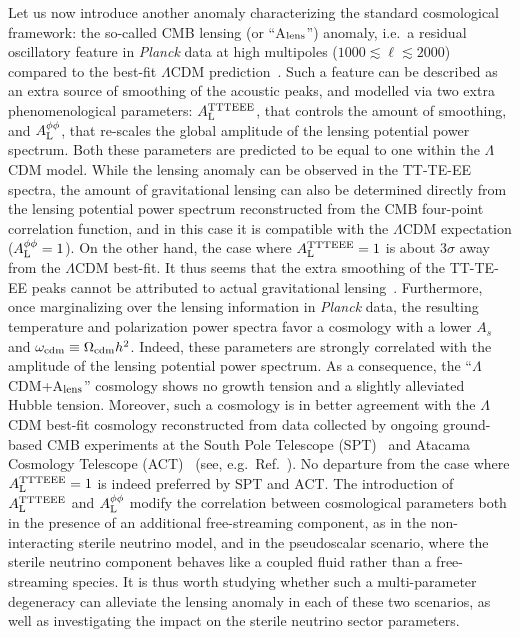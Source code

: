 \documentclass[a4paper,11pt]{article}
\begin{document}
Let us now introduce another anomaly characterizing the standard cosmological framework: the so-called CMB lensing (or ``A$_{\rm lens}$'') anomaly, i.e.\ a residual oscillatory feature in \emph{Planck} data at high multipoles ($1000 \lesssim \ell \lesssim 2000$) compared to the best-fit $\Lambda$CDM prediction~\cite{Calabrese:2008rt,Aghanim:2016sns,Planck:2018vyg,Efstathiou:2019mdh}.
Such a feature can be described as an extra source of smoothing of the acoustic peaks, and modelled via two extra {phenomenological} parameters: $A_{\rm L}^{\rm TTTEEE}$, that controls the amount of smoothing, and $A_{\rm L}^{\rm \phi\phi}$, that re-scales the global amplitude of the lensing potential power spectrum. Both these parameters are predicted to be equal to one within the $\Lambda$CDM model. While the lensing anomaly can be observed in the TT-TE-EE spectra, the amount of gravitational lensing can also be determined directly from the lensing potential power spectrum reconstructed from the CMB four-point correlation function, and {in this case it} is compatible with the $\Lambda$CDM expectation ($A_{\rm L}^{\rm \phi\phi} = 1$).
On the other hand, the case where $A_{\rm L}^{\rm TTTEEE} = 1$ is about $3 \sigma$ away from the $\Lambda$CDM best-fit.
It thus seems that the extra smoothing of the TT-TE-EE peaks cannot be attributed to actual gravitational lensing~\cite{Aghanim:2016sns, Motloch:2018pjy, Motloch:2019gux}.
Furthermore, once marginalizing over the lensing information in \emph{Planck} data, the resulting temperature and polarization power spectra favor a cosmology with a lower $A_s$ and $\omega_{\rm cdm} \equiv \Omega_{\rm cdm}h^2$.
Indeed, these parameters are strongly correlated with the amplitude of the lensing potential power spectrum.
As a consequence, the ``$\Lambda$CDM+A$_{\rm lens}$'' cosmology shows no growth tension and a slightly alleviated Hubble tension.
Moreover, such a cosmology is in better agreement with the $\Lambda$CDM best-fit cosmology reconstructed from data collected by ongoing ground-based CMB experiments at the South Pole Telescope (SPT)~\cite{Henning:2017nuy,Chudaykin:2020acu} and Atacama Cosmology Telescope (ACT)~\cite{Aiola:2020azj,Choi:2020ccd} (see, e.g.~Ref.~\cite{Handley:2020hdp}).
No departure from the case where $A_{\rm L}^{\rm TTTEEE} = 1$ is indeed {preferred} by SPT and ACT.
The introduction of $A_{\rm{L}}^{\rm{TTTEEE}}$ and $A_{\rm{L}}^{\phi\phi}$ modify the correlation between cosmological parameters both in the presence of an additional free-streaming component, as in the non-interacting sterile neutrino model, and in the pseudoscalar scenario, where the sterile neutrino component behaves like a coupled fluid rather than a free-streaming species. It is thus worth studying whether such a multi-parameter degeneracy can alleviate the lensing anomaly in each of these two scenarios, as well as investigating the impact on the sterile neutrino sector parameters.
\end{document}
